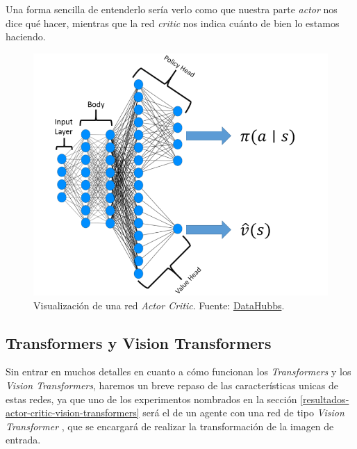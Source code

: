 Una forma sencilla de entenderlo sería verlo como que nuestra parte \textit{actor} nos dice qué hacer, mientras que la red \textit{critic} nos indica cuánto de bien lo estamos haciendo.
\medskip

\begin{figure}[ht!]
  \centering
  \includegraphics[width=.5\textwidth]{figuras/actor_critic_arquitecture.png}
  \caption[Visualización de una red \textit{Actor Critic}.]{Visualización de una red \textit{Actor Critic}. Fuente: \href{https://www.datahubbs.com/two-headed-a2c-network-in-pytorch/}{DataHubbs}.}
  \label{fig-actor-critic-arquitecture}
\end{figure}

\subsection{Transformers y Vision Transformers}
\label{vision-transformers}

Sin entrar en muchos detalles en cuanto a cómo funcionan los \textit{Transformers} y los \textit{Vision Transformers}, haremos un breve repaso de las características unicas de estas redes, ya que uno de los experimentos nombrados en la sección \ref{resultados-actor-critic-vision-transformers} será el de un agente con una red de tipo \textit{Vision Transformer} \citep{visiontransformers}, que se encargará de realizar la transformación de la imagen de entrada.
\medskip

